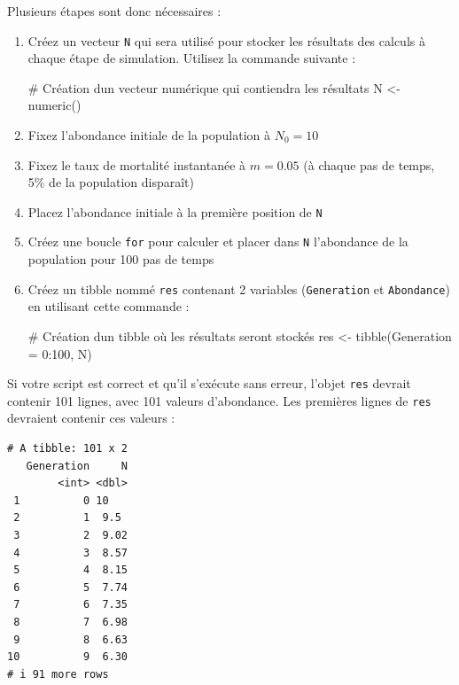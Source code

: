 \documentclass[
  french,
  a4paper,
  DIV=11,
  numbers=noendperiod,
  oneside]{scrreprt}
\newenvironment{Shaded}{}{}
\newcommand{\AttributeTok}[1]{\textcolor[rgb]{0.84,0.23,0.29}{#1}}
\newcommand{\CommentTok}[1]{\textcolor[rgb]{0.42,0.45,0.49}{#1}}
\newcommand{\DecValTok}[1]{\textcolor[rgb]{0.00,0.36,0.77}{#1}}
\newcommand{\FunctionTok}[1]{\textcolor[rgb]{0.44,0.26,0.76}{#1}}
\newcommand{\NormalTok}[1]{\textcolor[rgb]{0.14,0.16,0.18}{#1}}
\newcommand{\OtherTok}[1]{\textcolor[rgb]{0.44,0.26,0.76}{#1}}
\newcommand{\SpecialCharTok}[1]{\textcolor[rgb]{0.00,0.36,0.77}{#1}}
\begin{document}
\begin{tcolorbox}
Plusieurs étapes sont donc nécessaires :

\begin{enumerate}
\def\labelenumi{\arabic{enumi}.}
\item
  Créez un vecteur \texttt{N} qui sera utilisé pour stocker les
  résultats des calculs à chaque étape de simulation. Utilisez la
  commande suivante :

\begin{Shaded}
\begin{Highlighting}[]
\CommentTok{\# Création d\textquotesingle{}un vecteur numérique qui contiendra les résultats}
\NormalTok{N }\OtherTok{\textless{}{-}} \FunctionTok{numeric}\NormalTok{()}
\end{Highlighting}
\end{Shaded}
\item
  Fixez l'abondance initiale de la population à \(N_0 = 10\)
\item
  Fixez le taux de mortalité instantanée à \(m = 0.05\) (à chaque pas de
  temps, 5\% de la population disparaît)
\item
  Placez l'abondance initiale à la première position de \texttt{N}
\item
  Créez une boucle \texttt{for} pour calculer et placer dans \texttt{N}
  l'abondance de la population pour 100 pas de temps
\item
  Créez un tibble nommé \texttt{res} contenant 2 variables
  (\texttt{Generation} et \texttt{Abondance}) en utilisant cette
  commande :

\begin{Shaded}
\begin{Highlighting}[]
\CommentTok{\# Création d\textquotesingle{}un tibble où les résultats seront stockés}
\NormalTok{res }\OtherTok{\textless{}{-}} \FunctionTok{tibble}\NormalTok{(}\AttributeTok{Generation =} \DecValTok{0}\SpecialCharTok{:}\DecValTok{100}\NormalTok{, N)}
\end{Highlighting}
\end{Shaded}
\end{enumerate}

Si votre script est correct et qu'il s'exécute sans erreur, l'objet
\texttt{res} devrait contenir 101 lignes, avec 101 valeurs d'abondance.
Les premières lignes de \texttt{res} devraient contenir ces valeurs :

\begin{verbatim}
# A tibble: 101 x 2
   Generation     N
        <int> <dbl>
 1          0 10   
 2          1  9.5 
 3          2  9.02
 4          3  8.57
 5          4  8.15
 6          5  7.74
 7          6  7.35
 8          7  6.98
 9          8  6.63
10          9  6.30
# i 91 more rows
\end{verbatim}


\end{tcolorbox}
\end{document}
